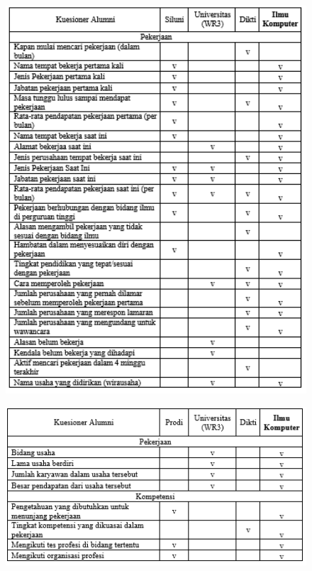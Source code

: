 \begin{figure}[H]
	\centering
	\includegraphics[width=1.0\textwidth]{gambar/tabelKuesioner2}
	\label{tabelKuesioner2}
\end{figure}

\begin{figure}[H]
	\centering
	\includegraphics[width=1.0\textwidth]{gambar/tabelKuesioner3}
	\label{tabelKuesioner3}
\end{figure}

